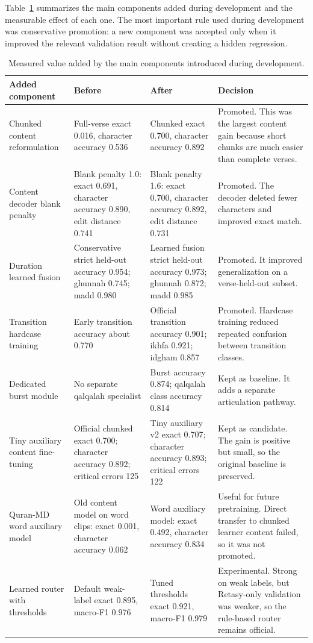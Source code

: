 Table~\ref{tab:added_components_ablation} summarizes the main components added
during development and the measurable effect of each one. The most important
rule used during development was conservative promotion: a new component was
accepted only when it improved the relevant validation result without creating a
hidden regression.

\begin{table}[H]
\centering
\small
\begin{tabularx}{\textwidth}{p{} p{} p{} X}
\toprule
\textbf{Added component} & \textbf{Before} & \textbf{After} & \textbf{Decision} \\
\midrule
Chunked content reformulation &
Full-verse exact 0.016, character accuracy 0.536 &
Chunked exact 0.700, character accuracy 0.892 &
Promoted. This was the largest content gain because short chunks are much
easier than complete verses. \\
\midrule
Content decoder blank penalty &
Blank penalty 1.0: exact 0.691, character accuracy 0.890, edit distance 0.741 &
Blank penalty 1.6: exact 0.700, character accuracy 0.892, edit distance 0.731 &
Promoted. The decoder deleted fewer characters and improved exact match. \\
\midrule
Duration learned fusion &
Conservative strict held-out accuracy 0.954; ghunnah 0.745; madd 0.980 &
Learned fusion strict held-out accuracy 0.973; ghunnah 0.872; madd 0.985 &
Promoted. It improved generalization on a verse-held-out subset. \\
\midrule
Transition hardcase training &
Early transition accuracy about 0.770 &
Official transition accuracy 0.901; ikhfa 0.921; idgham 0.857 &
Promoted. Hardcase training reduced repeated confusion between transition
classes. \\
\midrule
Dedicated burst module &
No separate qalqalah specialist &
Burst accuracy 0.874; qalqalah class accuracy 0.814 &
Kept as baseline. It adds a separate articulation pathway. \\
\midrule
Tiny auxiliary content fine-tuning &
Official chunked exact 0.700; character accuracy 0.892; critical errors 125 &
Tiny auxiliary v2 exact 0.707; character accuracy 0.893; critical errors 122 &
Kept as candidate. The gain is positive but small, so the original baseline is
preserved. \\
\midrule
Quran-MD word auxiliary model &
Old content model on word clips: exact 0.001, character accuracy 0.062 &
Word auxiliary model: exact 0.492, character accuracy 0.834 &
Useful for future pretraining. Direct transfer to chunked learner content failed,
so it was not promoted. \\
\midrule
Learned router with thresholds &
Default weak-label exact 0.895, macro-F1 0.976 &
Tuned thresholds exact 0.921, macro-F1 0.979 &
Experimental. Strong on weak labels, but Retasy-only validation was weaker, so
the rule-based router remains official. \\
\bottomrule
\end{tabularx}
\caption{Measured value added by the main components introduced during development.}
\label{tab:added_components_ablation}
\end{table}

